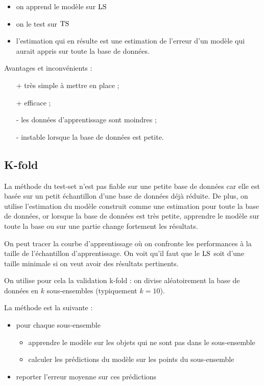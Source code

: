 	\begin{itemize}
		\item on apprend le modèle sur $\text{LS}$
		\item on le test sur $\text{TS}$
		\item l'estimation qui en résulte est une estimation de l'erreur d'un modèle qui aurait appris sur toute la base de données.
	\end{itemize}
	
	Avantages et inconvénients :
	
	\begin{itemize}
		\item[+] très simple à mettre en place ;
		\item[+] efficace ;
		\item[-] les données d'apprentissage sont moindres ;
		\item[-] instable lorsque la base de données est petite.
	\end{itemize}
	
	
	\subsection{K-fold}
	
	La méthode du test-set n'est pas fiable sur une petite base de données car elle est basée sur un petit échantillon d'une base de données déjà réduite. De plus, on utilise l'estimation du modèle construit comme une estimation pour toute la base de données, or lorsque la base de données est très petite, apprendre le modèle sur toute la base ou sur une partie change fortement les résultats.
	
	On peut tracer la courbe d'apprentissage où on confronte les performances à la taille de l'échantillon d'apprentissage. On voit qu'il faut que le $\text{LS}$ soit d'une taille minimale si on veut avoir des résultats pertinents.
	
	
	On utilise pour cela la validation k-fold : on divise aléatoirement la base de données en $k$ sous-ensembles (typiquement $k = 10$).
	
	
	La méthode est la suivante :
	
	\begin{itemize}
		\item pour chaque sous-ensemble
		\begin{itemize}
			\item apprendre le modèle sur les objets qui ne sont pas dans le sous-ensemble
			\item calculer les prédictions du modèle sur les points du sous-ensemble
		\end{itemize}
		\item reporter l'erreur moyenne sur ces prédictions
	\end{itemize}
	
